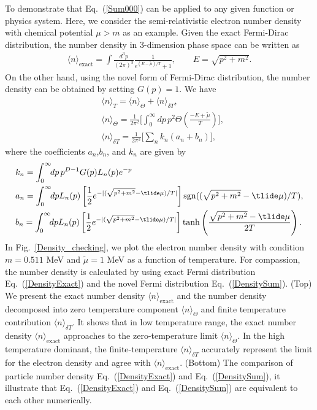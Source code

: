 \documentclass[sn-mathphys,Numbered]{sn-jnl}
\begin{document}
To demonstrate that Eq.~(\ref{Sum000}) can be applied to any given function or physics system. Here, we consider the semi-relativistic electron number density with chemical potential $\mu>m$ as an example. Given the exact Fermi-Dirac distribution, the number density  in $3$-dimension phase space can be written 
as
\begin{align}
\label{DensityExact}
\langle n\rangle _{\mathrm{exact}}=\int\frac{d^3p}{(2\pi)^3}\frac{1}{e^{(E-\tilde\mu)/T}+1},\qquad E=\sqrt{p^2+m^2}.
\end{align}
On the other hand, using the novel form of Fermi-Dirac distribution, the number density can be obtained by setting $G(p)=1$. We have
\begin{align}
\label{DensitySum}
&\langle n\rangle_T=\langle n\rangle_\Theta+\langle n\rangle_{\delta T},\\
&\langle n\rangle_\Theta=\frac{1}{2\pi^2}\bigg[\int^\infty_0\!\!dp\,p^2\Theta\left(\frac{-E+\tilde\mu}{T}\right)\bigg],\\
&\langle n\rangle_{\delta T}=\frac{1}{2\pi^2}\bigg[\sum_n k_n(a_n+b_n)\bigg],
\end{align}
where the coefficients $a_n$,$b_n$, and $k_n$ are given by
\begin{align}
&k_n=\int_0^\infty\!\!dp\,p^{D-1}G(p)L_n(p)e^{-p}\\
&a_n=\int_0^\infty\!\!dpL_n(p)\left[\frac{1}{2}e^{-|(\sqrt{p^2+m^2}-\tlide\mu)/T|}\right]\mathrm{sgn}((\sqrt{p^2+m^2}-\tlide\mu)/T),\\
&b_n=\int_0^\infty\!\!dpL_n(p)\left[\frac{1}{2}e^{-|(\sqrt{p^2+m^2}-\tlide\mu)/T|}\right]\tanh\left(\frac{\sqrt{p^2+m^2}-\tlide\mu}{2T}\right).
\end{align}
In Fig.~\ref{Density_checking}, we plot the electron number density with condition $m=0.511$ MeV and $\tilde\mu=1$ MeV as a function of temperature.  For compassion, the number density is calculated by using  exact Fermi distribution Eq.~(\ref{DensityExact}) and the novel Fermi distribution Eq.~(\ref{DensitySum}). (Top) We present the exact number density $\langle n\rangle _{\mathrm{exact}}$ and the number density  decomposed into zero temperature component $\langle n\rangle_\Theta$ and finite temperature contribution $\langle n\rangle_{\delta T}$. It shows that in low temperature range, the exact number density $\langle n\rangle _{\mathrm{exact}}$ approaches to the zero-temperature limit $\langle n\rangle_\Theta$. In the high temperature dominant, the finite-temperature $\langle n\rangle_{\delta T}$ accurately represent the limit for the electron density and agree with $\langle n\rangle _{\mathrm{exact}}$. (Bottom) The comparison of particle number density Eq.~(\ref{DensityExact}) and Eq.~(\ref{DensitySum}), it illustrate that Eq.~(\ref{DensityExact}) and Eq.~(\ref{DensitySum}) are equivalent to each other numerically.
\end{document}
